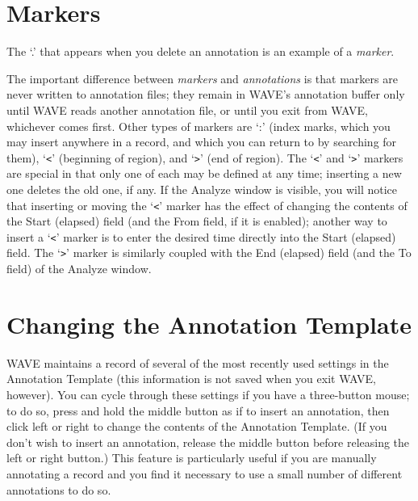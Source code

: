 \documentclass[twoside]{book}
\newcommand{\WAVE}{{\sf WAVE}\xspace}
\begin{document}
\section{Markers}

The `{\sf .}' that appears when you delete an annotation is an example
of a \emph{marker}.
\begin{htmlonly}
\end{htmlonly}
\begin{latexonly}
\end{latexonly}
The important difference
between \emph{markers} and \emph{annotations}
is that markers are never written to
annotation files; they remain in \WAVE{}'s annotation buffer only
until \WAVE{} reads another annotation file, or until you exit from
\WAVE{}, whichever comes first.  Other types of markers are `{\sf :}'
(index marks,
which you may insert anywhere in a
record, and which you can return to by searching for them), `{\tt <}'
(beginning of region), and `{\tt >}' (end of region).
The `{\tt <}' and `{\tt >}' markers are special in that only
one of each may be defined at any time; inserting a new one deletes
the old one, if any.  If the {\sf Analyze} window
is visible, you will notice that
inserting or moving the `{\tt <}' marker has the effect of changing
the contents of the {\sf Start (elapsed)} field (and the {\sf From}
field, if it is enabled); another way to insert a `{\tt <}' marker is
to enter the desired time directly into the {\sf Start (elapsed)}
field.  The `{\tt >}' marker is similarly coupled with the {\sf End
(elapsed)} field (and the {\sf To} field) of the {\sf Analyze} window.

\section{Changing the {\sf Annotation Template}}

\WAVE{} maintains a record of several of the most recently used settings
in the {\sf Annotation Template} (this information is not saved when
you exit \WAVE{}, however).  You can cycle through these settings if you
have a three-button mouse; to do so, press and hold the middle button
as if to insert an annotation, then click left or right to change the
contents of the {\sf Annotation Template}.  (If you don't wish to
insert an annotation, release the middle button before releasing the
left or right button.)  This feature is particularly useful if you are
manually annotating a record and you find it necessary to use a small
number of different annotations to do so.
\end{document}
